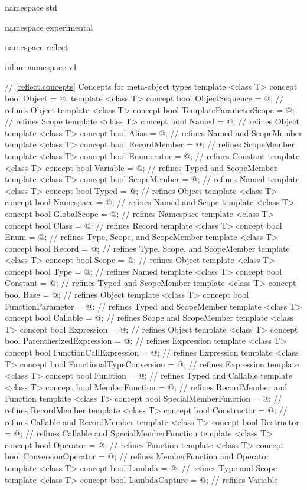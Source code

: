 \begin{std.txt}\color{addclr}
\begin{codeblock}
namespace std {
namespace experimental {
namespace reflect {
inline namespace v1 {

// \ref{reflect.concepts} Concepts for meta-object types
template <class T>
concept bool Object = @\seebelow@;
template <class T>
concept bool ObjectSequence = @\seebelow@; // refines Object
template <class T>
concept bool TemplateParameterScope = @\seebelow@; // refines Scope
template <class T>
concept bool Named = @\seebelow@;          // refines Object
template <class T>
concept bool Alias = @\seebelow@;          // refines Named and ScopeMember
template <class T>
concept bool RecordMember = @\seebelow@;   // refines ScopeMember
template <class T>
concept bool Enumerator = @\seebelow@;     // refines Constant
template <class T>
concept bool Variable = @\seebelow@;       // refines Typed and ScopeMember
template <class T>
concept bool ScopeMember = @\seebelow@;    // refines Named
template <class T>
concept bool Typed = @\seebelow@;          // refines Object
template <class T>
concept bool Namespace = @\seebelow@;      // refines Named and Scope
template <class T>
concept bool GlobalScope = @\seebelow@;    // refines Namespace
template <class T>
concept bool Class = @\seebelow@;          // refines Record
template <class T>
concept bool Enum = @\seebelow@;           // refines Type, Scope, and ScopeMember
template <class T>
concept bool Record = @\seebelow@;         // refines Type, Scope, and ScopeMember
template <class T>
concept bool Scope = @\seebelow@;          // refines Object
template <class T>
concept bool Type = @\seebelow@;           // refines Named
template <class T>
concept bool Constant = @\seebelow@;       // refines Typed and ScopeMember
template <class T>
concept bool Base = @\seebelow@;           // refines Object
template <class T>
concept bool FunctionParameter = @\seebelow@; // refines Typed and ScopeMember
template <class T>
concept bool Callable = @\seebelow@;       // refines Scope and ScopeMember
template <class T>
concept bool Expression = @\seebelow@;     // refines Object
template <class T>
concept bool ParenthesizedExpression = @\seebelow@;  // refines Expression
template <class T>
concept bool FunctionCallExpression = @\seebelow@;   // refines Expression
template <class T>
concept bool FunctionalTypeConversion = @\seebelow@; // refines Expression
template <class T>
concept bool Function = @\seebelow@;       // refines Typed and Callable
template <class T>
concept bool MemberFunction = @\seebelow@; // refines RecordMember and Function
template <class T>
concept bool SpecialMemberFunction = @\seebelow@; // refines RecordMember
template <class T>
concept bool Constructor = @\seebelow@;    // refines Callable and RecordMember
template <class T>
concept bool Destructor = @\seebelow@;     // refines Callable and SpecialMemberFunction
template <class T>
concept bool Operator = @\seebelow@;       // refines Function
template <class T>
concept bool ConversionOperator = @\seebelow@; // refines MemberFunction and Operator
template <class T>
concept bool Lambda = @\seebelow@;         // refines Type and Scope
template <class T>
concept bool LambdaCapture = @\seebelow@;  // refines Variable


}}}}
\end{codeblock}
\end{std.txt}
